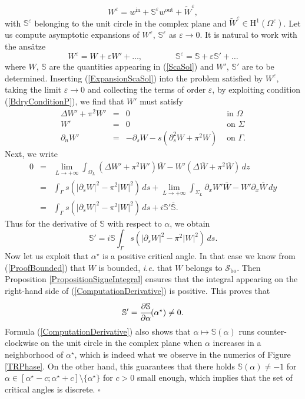 \documentclass[11pt,a4paper]{article}
\newcommand{\dsp}{\displaystyle}
\newcommand{\eps}{\varepsilon}
\newcommand{\Om}{\Omega}
\newcommand{\mrm}[1]{\mathrm{#1}}
\newcommand{\mH}{\mrm{H}}
\newcommand{\mX}{\mathscr{S}}
\begin{document}
\[
W^\eps  = w^{\mrm{in}}+\mathbb{S}^\eps w^{\mrm{out}}+\widetilde{W}^\eps,
\]
with $\mathbb{S}^\eps$ belonging to the unit circle in the complex plane and $\widetilde{W}^\eps\in\mH^1(\Om^\eps)$. Let us compute asymptotic expansions of  $W^\eps$, $\mathbb{S}^\eps$ as $\eps\to0$. It is natural to work  with the ans\"atze
\begin{equation}\label{ExpansionScaSol}
W^\eps=W+\eps W'+\dots,\qquad\qquad \mathbb{S}^\eps=\mathbb{S}+\eps \mathbb{S}'+\dots
\end{equation}
where $W$, $\mathbb{S}$ are the quantities appearing in (\ref{ScaSol}) and $W'$, $\mathbb{S}'$ are to be determined. Inserting (\ref{ExpansionScaSol}) into the problem satisfied by $W^\eps$, taking the limit $\eps\to0$ and collecting the terms of order $\eps$, by exploiting condition (\ref{BdryConditionP}), we find that $W'$ must satisfy
\[
\begin{array}{|rcll}
\Delta W'+\pi^2W'&=&0&\mbox{ in }\Om\\
W'&=&0&\mbox{ on } \Sigma\\[3pt]
\partial_n W'  &=& -\partial_sW- s(\partial^2_sW+\pi^2W) & \mbox{ on }\Gamma.
\end{array}
\]
Next, we write
\[
\begin{array}{rcl}
0&=&\dsp\underset{L\to+\infty}{\lim} \dsp\int_{\Om_L}(\Delta W'+\pi^2W')\overline{W}-W'(\Delta \overline{W}+\pi^2\overline{W})\,dz\\[10pt]
& =& \dsp\int_{\Gamma}s\left(|\partial_sW|^2-\pi^2|W|^2\right)\,ds+\dsp\underset{L\to+\infty}{\lim}\int_{\Sigma_L}\partial_xW' \overline{W}-W'\partial_x\overline{W}\,dy\\[10pt]
& =& \dsp\int_{\Gamma}s\left(|\partial_sW|^2-\pi^2|W|^2\right)\,ds+i\mathbb{S}'\overline{\mathbb{S}}.
\end{array}
\]
Thus for the derivative of $\mathbb{S}$ with respect to $\alpha$, we obtain
\begin{equation}\label{ComputationDerivative}
\mathbb{S}'=i\mathbb{S}\dsp\int_{\Gamma}s\left(|\partial_sW|^2-\pi^2|W|^2\right)\,ds.
\end{equation}
Now let us exploit that $\alpha^\star$ is a positive critical angle. In that case we know from (\ref{ProofBounded}) that $W$ is bounded, \textit{i.e.} that $W$ belongs to $\mX_{\mrm{bo}}$. Then Proposition \ref{PropositionSigneIntegral} ensures that the integral appearing on the right-hand side of (\ref{ComputationDerivative}) is positive. This proves that
\[
\mathbb{S}'=\cfrac{\partial\mathbb{S}}{\partial\alpha}(\alpha^\star)\ne0.
\]
Formula (\ref{ComputationDerivative}) also shows that $\alpha\mapsto \mathbb{S}(\alpha)$ runs counter-clockwise on the unit circle in the complex plane when $\alpha$ increases in a neighborhood of $\alpha^\star$, which is indeed what we observe in the numerics of Figure \ref{TRPhase}. On the other hand, this guarantees that there holds $\mathbb{S}(\alpha)\ne-1$ for $\alpha\in[\alpha^\star-c;\alpha^\star+c]\setminus\{\alpha^\star\}
$ for $c>0$ small enough, which implies that the set of critical angles is discrete. \hfill $\square$
\end{document}
